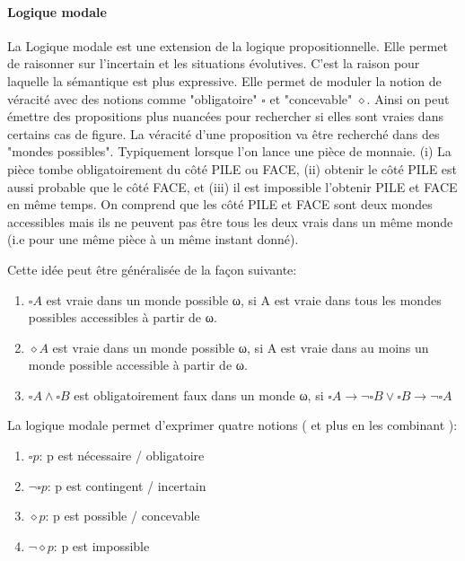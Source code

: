 \begin{refsegment}
    \paragraph{Logique modale}
    La Logique modale est une extension de la logique propositionnelle. Elle permet de raisonner sur l'incertain et les situations évolutives. C’est la raison pour laquelle la sémantique est plus expressive. Elle permet de moduler la notion de véracité avec des notions comme "obligatoire" $\square$ et "concevable" $\diamond$. Ainsi on peut émettre des propositions plus nuancées pour rechercher si elles sont vraies dans certains cas de figure. La véracité d'une proposition va être recherché dans des "mondes possibles". Typiquement lorsque l'on lance une pièce de monnaie. (i) La pièce tombe obligatoirement du côté PILE ou FACE, (ii) obtenir le côté PILE est aussi probable que le côté FACE, et (iii) il est impossible l'obtenir PILE et FACE en même temps. On comprend que les côté PILE et FACE sont deux mondes accessibles mais ils ne peuvent pas être tous les deux vrais dans un même monde (i.e pour une même pièce à un même instant donné).
    
    Cette idée peut être généralisée de la façon suivante:\nolisttopbreak
    \begin{enumerate}[label=\roman*)]
        \item $\square A$ est vraie dans un monde possible ω, si A est vraie dans tous les mondes possibles accessibles à partir de ω.
        \item $\diamond A$ est vraie dans un monde possible ω, si A est vraie dans au moins un monde possible accessible à partir de ω.
        \item $\square A \land \square B$ est obligatoirement faux dans un monde ω, si $\square A \to \lnot \square B \lor \square B \to \lnot\square A$
    \end{enumerate}

    La logique modale permet d'exprimer quatre notions ( et plus en les combinant ):\nolisttopbreak
    \begin{enumerate}[label={}]
        \item $\square p$: p est nécessaire / obligatoire
        \item $\lnot\square p$: p est contingent / incertain
        \item $\diamond p$: p est possible / concevable
        \item $\lnot \diamond p$: p est impossible
    \end{enumerate}


\end{refsegment}
